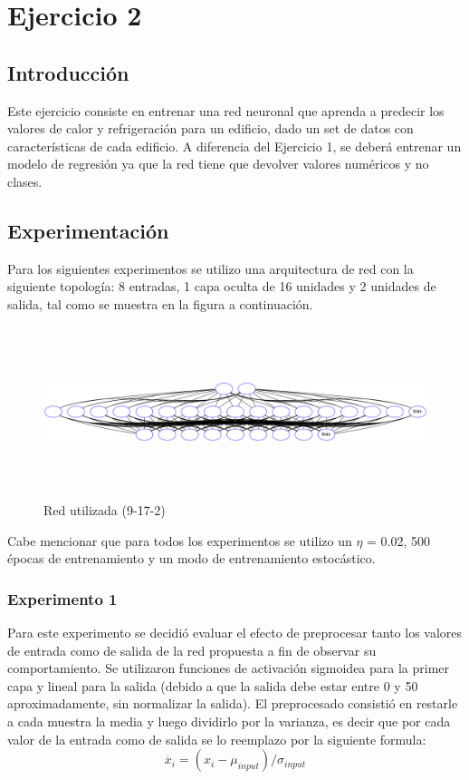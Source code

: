 \section{Ejercicio 2}

\subsection{Introducción}
Este ejercicio consiste en entrenar una red neuronal que aprenda a predecir los valores de calor y refrigeración para un edificio, dado un set de datos
con características de cada edificio. A diferencia del Ejercicio 1, se deberá entrenar un modelo de regresión ya que la red tiene que devolver valores
numéricos y no clases.

\subsection{Experimentación}
Para los siguientes experimentos se utilizo una arquitectura de red con la siguiente topología: 8 entradas, 1 capa oculta de 16 unidades y 2 unidades de salida,
tal como se muestra en la figura a continuación.

\begin{figure}[H]
  \includegraphics[width=12cm, height=5cm]{../plot/9-17-2.png}
  \centering
  \caption{Red utilizada (9-17-2)}
\end{figure}

Cabe mencionar que para todos los experimentos se utilizo un $\eta$ = 0.02, 500 épocas de entrenamiento y un modo de entrenamiento estocástico.
\subsubsection{Experimento 1}
Para este experimento se decidió evaluar el efecto de preprocesar tanto los valores de entrada como de salida de la red propuesta a fin de observar su
comportamiento. Se utilizaron funciones de activación sigmoidea para la primer capa y lineal para la salida (debido a que la salida debe estar entre 0 y 50 aproximadamente,
 sin normalizar la salida). El preprocesado consistió en restarle a cada muestra la media y luego dividirlo por la varianza, es decir que por cada valor de la entrada
como de salida se lo reemplazo por la siguiente formula:
\begin{equation}
  \dot{x_{i}} = (x_{i} - \mu_{input}) / \sigma_{input}
\end{equation}

